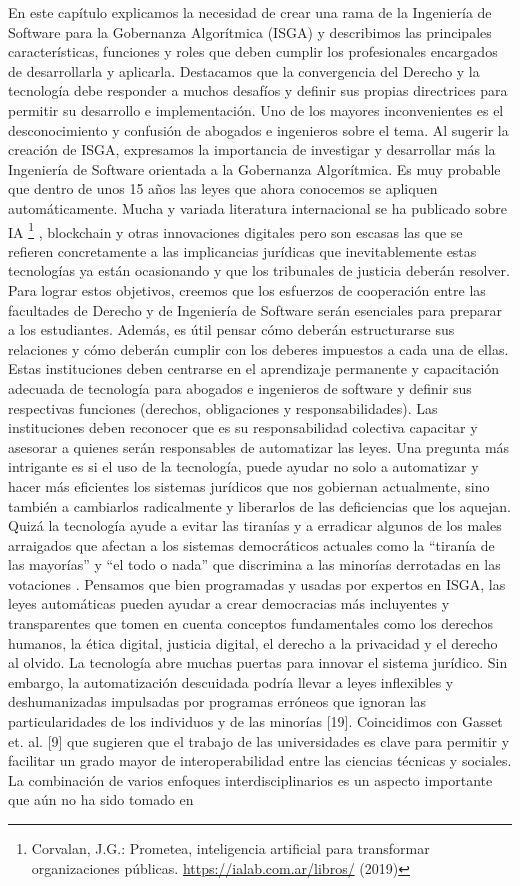 \documentclass[12pt]{report} %
\begin{document}
En este capítulo explicamos la necesidad de crear una rama de la Ingeniería de Software para la Gobernanza Algorítmica (ISGA) y describimos las principales características, funciones y roles que deben cumplir los profesionales encargados de desarrollarla y aplicarla. Destacamos que la convergencia del Derecho y la tecnología debe responder a muchos desafíos y definir sus propias directrices para permitir su desarrollo e implementación. Uno de los mayores inconvenientes es el desconocimiento y confusión de abogados e ingenieros sobre el tema. Al sugerir la creación de ISGA, expresamos la importancia de investigar y desarrollar más la Ingeniería de Software orientada a la Gobernanza Algorítmica. Es muy probable que dentro de unos 15 años las leyes que ahora conocemos se apliquen automáticamente. Mucha y variada literatura internacional se ha publicado sobre IA \footnote{Corvalan, J.G.: Prometea, inteligencia artificial para transformar organizaciones públicas. \url{https://ialab.com.ar/libros/} (2019)} , blockchain y otras innovaciones digitales pero son escasas las que se refieren concretamente a las implicancias jurídicas que inevitablemente estas tecnologías ya están ocasionando y que los tribunales de justicia deberán resolver. Para lograr estos objetivos, creemos que los esfuerzos de cooperación entre las facultades de Derecho y de Ingeniería de Software serán esenciales para preparar a los estudiantes. Además, es útil pensar cómo deberán estructurarse sus relaciones y cómo deberán cumplir con los deberes impuestos a cada una de ellas. Estas instituciones deben centrarse en el aprendizaje permanente y capacitación adecuada de tecnología para abogados e ingenieros de software y definir sus respectivas funciones (derechos, obligaciones y responsabilidades). Las instituciones deben reconocer que es su responsabilidad colectiva capacitar y asesorar a quienes serán responsables de automatizar las leyes. Una pregunta más intrigante es si el uso de la tecnología, puede ayudar no solo a automatizar y hacer más eficientes los sistemas jurídicos que nos gobiernan actualmente, sino también a cambiarlos radicalmente y liberarlos de las deficiencias que los aquejan. Quizá la tecnología ayude a evitar las tiranías y a erradicar algunos de los males arraigados que afectan a los sistemas democráticos actuales como la “tiranía de las mayorías” y “el todo o nada” que discrimina a las minorías derrotadas en las votaciones . Pensamos que bien programadas y usadas por expertos en ISGA, las leyes automáticas pueden ayudar a crear democracias más incluyentes y transparentes que tomen en cuenta conceptos fundamentales como los derechos humanos, la ética digital, justicia digital, el derecho a la privacidad y el derecho al olvido. La tecnología abre muchas puertas para innovar el sistema jurídico. Sin embargo, la automatización descuidada podría llevar a leyes inflexibles y deshumanizadas impulsadas por programas erróneos que ignoran las particularidades de los individuos y de las minorías [19]. Coincidimos con Gasset et. al. [9] que sugieren que el trabajo de las universidades es clave para permitir y facilitar un grado mayor de interoperabilidad entre las ciencias técnicas y sociales. La combinación de varios enfoques interdisciplinarios es un aspecto importante que aún no ha sido tomado en 
\end{document}
